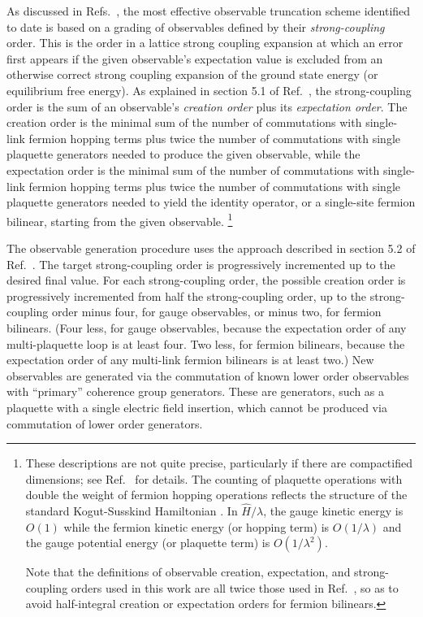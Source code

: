 \documentclass [12pt]{article}
\begin{document}
As discussed in Refs.~\cite{CSVAI,CSVAII},
the most effective observable truncation scheme identified
to date is based on a grading of observables defined by
their \emph{strong-coupling} order.
This is the order in
a lattice strong coupling expansion at which an error first appears
if the given observable's expectation value is excluded from
an otherwise correct strong coupling expansion of the
ground state energy (or equilibrium free energy).
As explained in section 5.1 of Ref.~\cite{CSVAII}, the
strong-coupling order is the sum of an observable's
\emph{creation order} plus its \emph{expectation order}.
The creation order is the minimal sum of
the number of commutations with single-link fermion hopping 
terms plus twice the number of commutations with
single plaquette generators needed to produce the given
observable, while
the expectation order is 
the minimal sum of the number of commutations with single-link
fermion hopping terms plus twice the number of commutations with
single plaquette generators needed to yield the identity operator,
or a single-site fermion bilinear, starting from the given observable.%
\footnote
    {%
    These descriptions are not quite precise, particularly if
    there are compactified dimensions; see Ref.~\cite{CSVAII} for details.
    The counting of plaquette operations with double the weight of
    fermion hopping operations reflects the structure of the
    standard Kogut-Susskind Hamiltonian \cite{Kogut:1974ag}.
    In $\hat H/\lambda$, the gauge kinetic energy is $O(1)$
    while the fermion kinetic energy (or hopping term) is $O(1/\lambda)$ and
    the gauge potential energy (or plaquette term) is $O(1/\lambda^2)$.
    
    Note that the definitions of observable creation, expectation,
    and strong-coupling orders used in this work are all twice those
    used in Ref.~\cite{CSVAII}, so as to avoid half-integral creation
    or expectation orders for fermion bilinears.
    }

The observable generation procedure uses
the approach described in section 5.2 of Ref.~\cite{CSVAII}.
The target strong-coupling order is progressively incremented
up to the desired final value.
For each strong-coupling order,
the possible creation order is progressively incremented
from half the strong-coupling order, up to the strong-coupling
order minus four, for gauge observables, or minus two, for fermion bilinears.
(Four less, for gauge observables, because the expectation order of
any multi-plaquette loop is at least four.
Two less, for fermion bilinears, because the expectation order of
any multi-link fermion bilinears is at least two.)
New observables are generated via the commutation of known
lower order observables with ``primary'' coherence group generators.
These are generators, such as a plaquette with a single electric field insertion,
which cannot be produced via commutation of lower order generators.
\end{document}
